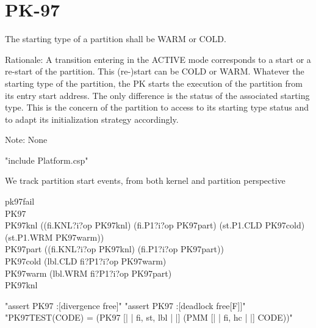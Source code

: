 \section{PK-97} %

       The starting type of a partition shall be WARM or COLD.

  Rationale: A transition entering in the ACTIVE mode corresponds to a start or
  a re-start of the partition. This (re-)start can be COLD or WARM. Whatever the
  starting type of the partition, the PK starts the execution of the partition
  from its entry start address. The only difference is the status of the
  associated starting type. This is the concern of the partition to access to
  its starting type status and to adapt its initialization strategy accordingly.

  Note: None

\begin{assert}
"include Platform.csp"
\end{assert}
 We track partition start events, from both kernel and partition perspective

\begin{circus}
\circchannel pk97fail\\

\circprocess PK97 \circdef \circbegin\\

  PK97knl \circdef ((fi.KNL?i?op \then PK97knl)  %
     \extchoice (fi.P1?i?op \then PK97part)  %
     \extchoice (st.P1.CLD \then PK97cold)
     \extchoice (st.P1.WRM \then PK97warm))\\

  PK97part \circdef ((fi.KNL?i?op \then PK97knl)  %
     \extchoice (fi.P1?i?op \then PK97part))\\  %

  PK97cold \circdef (lbl.CLD \then fi?P1?i?op \then PK97warm)\\ %

  PK97warm \circdef (lbl.WRM \then fi?P1?i?op \then PK97part)\\ %

  \circspot PK97knl\\ %
  \circend
\end{circus}
\begin{assert}
"assert PK97 :[divergence free]"
\also "assert PK97 :[deadlock free[F]]"
\also "PK97TEST(CODE) = (PK97 [| {| fi, st, lbl |} |] (PMM [| {| fi, hc |} |] CODE))"
\end{assert}
